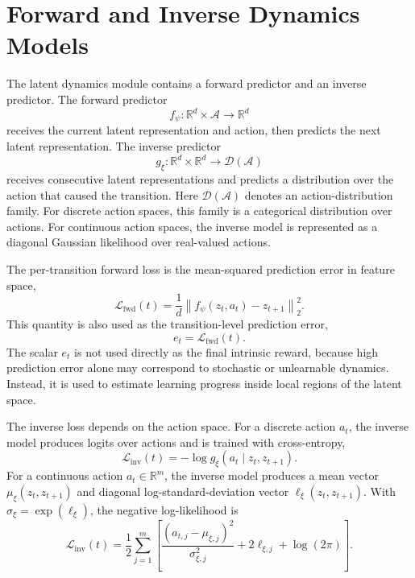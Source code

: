\section{Forward and Inverse Dynamics Models}
\label{sec:forward_and_inverse_dynamics_models}

The latent dynamics module contains a forward predictor and an inverse predictor.
The forward predictor
\begin{equation}
    f_\psi:\mathbb{R}^{d}\times\mathcal{A}\rightarrow\mathbb{R}^{d}
\end{equation}
receives the current latent representation and action, then predicts the next latent representation.
The inverse predictor
\begin{equation}
    g_\xi:\mathbb{R}^{d}\times\mathbb{R}^{d}\rightarrow\mathcal{D}(\mathcal{A})
\end{equation}
receives consecutive latent representations and predicts a distribution over the action that caused the transition.
Here $\mathcal{D}(\mathcal{A})$ denotes an action-distribution family.
For discrete action spaces, this family is a categorical distribution over actions.
For continuous action spaces, the inverse model is represented as a diagonal Gaussian likelihood over real-valued actions.

The per-transition forward loss is the mean-squared prediction error in feature space,
\begin{equation}
    \mathcal{L}_{\mathrm{fwd}}(t)
    = \frac{1}{d}\left\lVert f_\psi(z_t,a_t)-z_{t+1}\right\rVert_2^2.
    \label{eq:forward_loss}
\end{equation}
This quantity is also used as the transition-level prediction error,
\begin{equation}
    e_t=\mathcal{L}_{\mathrm{fwd}}(t).
    \label{eq:prediction_error}
\end{equation}
The scalar $e_t$ is not used directly as the final intrinsic reward, because high prediction error alone may correspond to stochastic or unlearnable dynamics.
Instead, it is used to estimate learning progress inside local regions of the latent space.

The inverse loss depends on the action space.
For a discrete action $a_t$, the inverse model produces logits over actions and is trained with cross-entropy,
\begin{equation}
    \mathcal{L}_{\mathrm{inv}}(t)
    = -\log g_\xi(a_t\mid z_t,z_{t+1}).
\end{equation}
For a continuous action $a_t\in\mathbb{R}^{m}$, the inverse model produces a mean vector $\mu_\xi(z_t,z_{t+1})$ and diagonal log-standard-deviation vector $\ell_\xi(z_t,z_{t+1})$.
With $\sigma_\xi=\exp(\ell_\xi)$, the negative log-likelihood is
\begin{equation}
    \mathcal{L}_{\mathrm{inv}}(t)
    = \frac{1}{2}\sum_{j=1}^{m}
    \left[
        \frac{(a_{t,j}-\mu_{\xi,j})^2}{\sigma_{\xi,j}^2}
        +2\ell_{\xi,j}
        +\log(2\pi)
    \right].
\end{equation}

